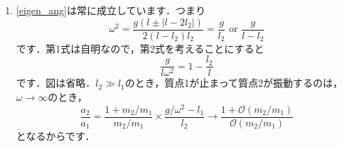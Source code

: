 \documentclass[a4paper,pdflatex,ja=standard]{bxjsarticle}
\begin{document}
\begin{enumerate}
  \item 
  \eqref{eigen_ang}は常に成立しています．つまり
  \begin{equation}
    \omega^2
    =
    \frac{g(l\pm|l-2l_2|)}{2(l-l_2)l_2}
    =
    \frac{g}{l_2}
    \text{\ or\ }
    \frac{g}{l-l_2}
  \end{equation}
  です．第1式は自明なので，第2式を考えることにすると
  \begin{equation}
    \frac{g}{l\omega^2}
    =
    1-\frac{l_2}{l}
  \end{equation}
  です．図は省略．$l_2\gg l_1$のとき，質点1が止まって質点2が振動するのは，$\omega\rightarrow\infty$のとき，
  \begin{equation}
    \frac{a_2}{a_1}
    =
    \frac{1+m_2/m_1}{m_2/m_1}
    \times
    \frac{g/\omega^2-l_1}{l_2}
    \rightarrow
    \frac{1+\mathcal{O}(m_2/m_1)}{\mathcal{O}(m_2/m_1)}
  \end{equation}
  となるからです．

\end{enumerate}
\end{document}
